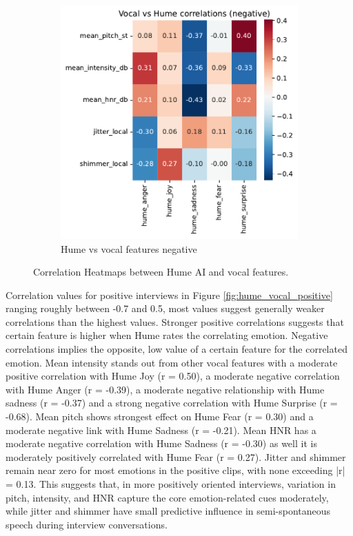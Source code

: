 \begin{figure}[!h]
\begin{subfigure}[b]{0.45\textwidth}
        \includegraphics[width=\textwidth]{png/results/rq1_nr3/vocal_vs_hume_correlations_negative.png.pdf}
        \caption{Hume vs vocal features negative}        
        \label{fig:hume_vocal_negative}
    \end{subfigure}   
    \caption{Correlation Heatmaps between Hume AI and vocal features.}
    \label{fig:rq1-heatmaps}     
\end{figure}
Correlation values for positive interviews in Figure \ref{fig:hume_vocal_positive} ranging roughly between -0.7 and 0.5, most values suggest generally weaker correlations than the highest values. Stronger positive correlations 
suggests that certain feature is higher when Hume rates the correlating emotion. Negative correlations implies the opposite, low value of a certain feature for the correlated emotion. 
Mean intensity stands out from other vocal features with a moderate positive correlation with Hume Joy (r = 0.50), a moderate negative correlation with Hume Anger (r = -0.39), a moderate negative relationship with Hume sadness (r = -0.37) and a strong negative correlation with Hume Surprise (r = -0.68). 
Mean pitch shows strongest effect on Hume Fear (r = 0.30) and a moderate negative link with Hume Sadness (r = -0.21). 
Mean HNR has a moderate negative correlation with Hume Sadness (r = -0.30) as well it is moderately positively correlated with Hume Fear (r = 0.27). 
Jitter and shimmer remain near zero for most emotions in the positive clips, with none exceeding |r| = 0.13. This suggests that, in more positively oriented interviews, 
variation in pitch, intensity, and HNR capture the core emotion-related cues moderately, while jitter and shimmer have small predictive influence in semi-spontaneous speech during interview conversations. 

